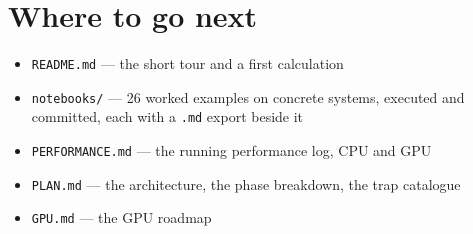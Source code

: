 \documentclass[11pt,a4paper]{article}
\newcommand{\code}[1]{\texttt{\small #1}}
\begin{document}
\section*{Where to go next}

\begin{itemize}\itemsep2pt
\item \code{README.md} --- the short tour and a first calculation
\item \code{notebooks/} --- 26 worked examples on concrete systems, executed and
  committed, each with a \code{.md} export beside it
\item \code{PERFORMANCE.md} --- the running performance log, CPU and GPU
\item \code{PLAN.md} --- the architecture, the phase breakdown, the trap catalogue
\item \code{GPU.md} --- the GPU roadmap
\end{itemize}
\end{document}
